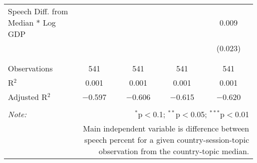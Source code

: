 \begin{table}[!htbp]
\begin{tabular}{@{\extracolsep{5pt}}lcccc}
 Speech Diff. from Median * Log GDP &  &  &  & 0.009 \\ 
  &  &  &  & (0.023) \\ 
  & & & & \\ 
\hline \\[-1.8ex] 
Observations & 541 & 541 & 541 & 541 \\ 
R$^{2}$ & 0.001 & 0.001 & 0.001 & 0.001 \\ 
Adjusted R$^{2}$ & $-$0.597 & $-$0.606 & $-$0.615 & $-$0.620 \\ 
\hline 
\hline \\[-1.8ex] 
\textit{Note:}  & \multicolumn{4}{r}{$^{*}$p$<$0.1; $^{**}$p$<$0.05; $^{***}$p$<$0.01} \\ 
 & \multicolumn{4}{r}{Main independent variable is difference between speech percent for a given country-session-topic observation from the country-topic median.} \\ 
\end{tabular} 
\end{table} 
